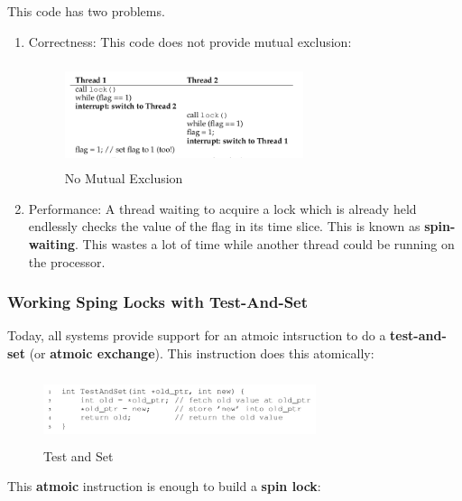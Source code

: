 This code has two problems.\\

\begin{enumerate}
    \item Correctness: This code does not provide mutual exclusion:
        \begin{figure}[h!]
            \begin{center}
                \includegraphics[width=7cm, height=3cm]{img/282.png}
                \caption{No Mutual Exclusion}
            \end{center}
        \end{figure}
    
    \item Performance: A thread waiting to acquire a lock which is already held
        endlessly checks the value of the flag in its time slice. This is known
        as \textbf{spin-waiting}. This wastes a lot of time while another thread
        could be running on the processor.
\end{enumerate}

\subsubsection{Working Sping Locks with Test-And-Set}

Today, all systems provide support for an atmoic intsruction to do a
\textbf{test-and-set} (or \textbf{atmoic exchange}). This instruction does this
atomically:

\begin{figure}[h!]
    \begin{center}
        \includegraphics[width=8cm, height=2cm]{img/testandset.png}
        \caption{Test and Set}
    \end{center}
\end{figure}

This \textbf{atmoic} instruction is enough to build a \textbf{spin lock}:

